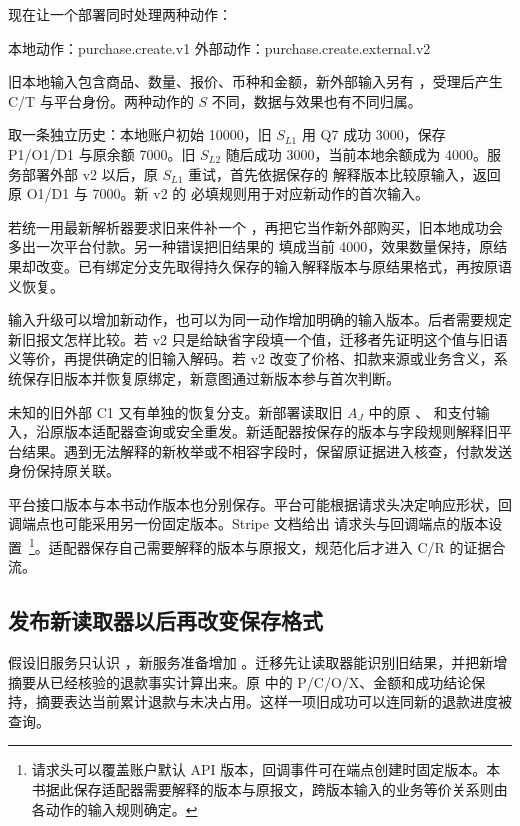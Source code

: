 现在让一个部署同时处理两种动作：
\begin{BookCode}
本地动作：purchase.create.v1
外部动作：purchase.create.external.v2
\end{BookCode}
旧本地输入包含商品、数量、报价、币种和金额，新外部输入另有 ，受理后产生 C/T 与平台身份。两种动作的 $S$ 不同，数据与效果也有不同归属。

取一条独立历史：本地账户初始 10000，旧 $S_{L1}$ 用 Q7 成功 3000，保存 P1/O1/D1 与原余额 7000。旧 $S_{L2}$ 随后成功 3000，当前本地余额成为 4000。服务部署外部 v2 以后，原 $S_{L1}$ 重试，首先依据保存的  解释版本比较原输入，返回原 O1/D1 与 7000。新 v2 的  必填规则用于对应新动作的首次输入。

若统一用最新解析器要求旧来件补一个 ，再把它当作新外部购买，旧本地成功会多出一次平台付款。另一种错误把旧结果的  填成当前 4000，效果数量保持，原结果却改变。已有绑定分支先取得持久保存的输入解释版本与原结果格式，再按原语义恢复。


输入升级可以增加新动作，也可以为同一动作增加明确的输入版本。后者需要规定新旧报文怎样比较。若 v2 只是给缺省字段填一个值，迁移者先证明这个值与旧语义等价，再提供确定的旧输入解码。若 v2 改变了价格、扣款来源或业务含义，系统保存旧版本并恢复原绑定，新意图通过新版本参与首次判断。

未知的旧外部 C1 又有单独的恢复分支。新部署读取旧 $A_J$ 中的原 、 和支付输入，沿原版本适配器查询或安全重发。新适配器按保存的版本与字段规则解释旧平台结果。遇到无法解释的新枚举或不相容字段时，保留原证据进入核查，付款发送身份保持原关联。

平台接口版本与本书动作版本也分别保存。平台可能根据请求头决定响应形状，回调端点也可能采用另一份固定版本。Stripe 文档给出  请求头与回调端点的版本设置~\cite{stripe-versioning}\footnote{请求头可以覆盖账户默认 API 版本，回调事件可在端点创建时固定版本。本书据此保存适配器需要解释的版本与原报文，跨版本输入的业务等价关系则由各动作的输入规则确定。}。适配器保存自己需要解释的版本与原报文，规范化后才进入 C/R 的证据合流。

\subsection*{发布新读取器以后再改变保存格式}

假设旧服务只认识 ，新服务准备增加 。迁移先让读取器能识别旧结果，并把新增摘要从已经核验的退款事实计算出来。原  中的 P/C/O/X、金额和成功结论保持，摘要表达当前累计退款与未决占用。这样一项旧成功可以连同新的退款进度被查询。


